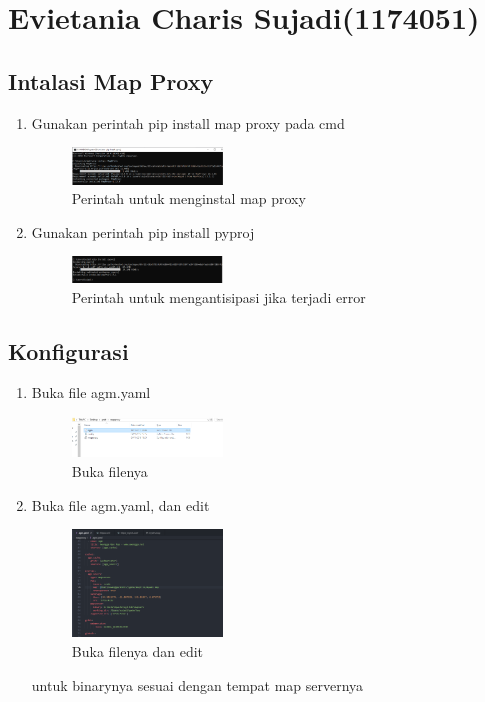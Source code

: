 \section{Evietania Charis Sujadi(1174051)}
\subsection{Intalasi Map Proxy}
\begin{enumerate}
    \item Gunakan perintah pip install map proxy pada cmd
    \hfill\break
    \begin{figure}[H]
		\includegraphics[width=4cm]{figures/1174051/5/4.png}
		\centering
		\caption{Perintah untuk menginstal map proxy}
    \end{figure}
    \item Gunakan perintah pip install pyproj
    \hfill\break
    \begin{figure}[H]
		\includegraphics[width=4cm]{figures/1174051/5/14.png}
		\centering
		\caption{Perintah untuk mengantisipasi jika terjadi error}
    \end{figure}
\end{enumerate}
\subsection{Konfigurasi}
\begin{enumerate}
    \item Buka file agm.yaml
    \hfill\break
    \begin{figure}[H]
		\includegraphics[width=4cm]{figures/1174051/5/15.png}
		\centering
		\caption{Buka filenya}
    \end{figure}
    \item Buka file agm.yaml, dan edit
    \hfill\break
    \begin{figure}[H]
		\includegraphics[width=4cm]{figures/1174051/5/16.png}
		\centering
		\caption{Buka filenya dan edit}
    \end{figure}
    untuk binarynya sesuai dengan tempat map servernya
\end{enumerate}
